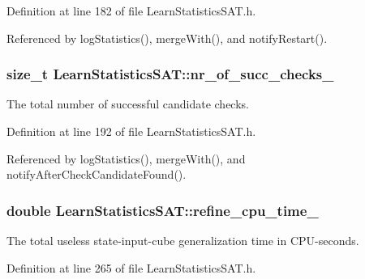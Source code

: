 Definition at line 182 of file Learn\-Statistics\-S\-A\-T.\-h.



Referenced by log\-Statistics(), merge\-With(), and notify\-Restart().

\hypertarget{classLearnStatisticsSAT_aa059a13f6afcf98a04be072aa5ce3f1d}{
\subsubsection[{nr\-\_\-of\-\_\-succ\-\_\-checks\-\_\-}]{\setlength{\rightskip}{0pt plus 5cm}size\-\_\-t Learn\-Statistics\-S\-A\-T\-::nr\-\_\-of\-\_\-succ\-\_\-checks\-\_\-\hspace{0.3cm}{\ttfamily [protected]}}}\label{classLearnStatisticsSAT_aa059a13f6afcf98a04be072aa5ce3f1d}


The total number of successful candidate checks. 



Definition at line 192 of file Learn\-Statistics\-S\-A\-T.\-h.



Referenced by log\-Statistics(), merge\-With(), and notify\-After\-Check\-Candidate\-Found().

\hypertarget{classLearnStatisticsSAT_ad50f0623e605d349f3221f9e1332805d}{
\subsubsection[{refine\-\_\-cpu\-\_\-time\-\_\-}]{\setlength{\rightskip}{0pt plus 5cm}double Learn\-Statistics\-S\-A\-T\-::refine\-\_\-cpu\-\_\-time\-\_\-\hspace{0.3cm}{\ttfamily [protected]}}}\label{classLearnStatisticsSAT_ad50f0623e605d349f3221f9e1332805d}


The total useless state-\/input-\/cube generalization time in C\-P\-U-\/seconds. 



Definition at line 265 of file Learn\-Statistics\-S\-A\-T.\-h.



